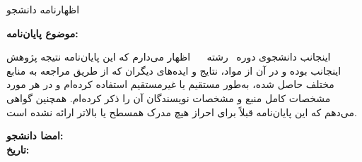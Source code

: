 
\begin{center}
  \vspace*{1.2cm}
  {\Titr\fontsize{18}{22}\selectfont اظهارنامه دانشجو}
\end{center}

\vspace{2em}

\noindent
\textbf{موضوع پایان‌نامه:} \TitleFA \par

\vspace{1em}

\noindent
اینجانب \textbf{\StudentNameFA} دانشجوی دوره \DegreeFA \ رشته \MajorFA \ \FacultyFA \ \UniversityFA
اظهار می‌دارم که این پایان‌نامه نتیجه پژوهش اینجانب بوده و در آن از مواد،
نتایج و ایده‌های دیگران که از طریق مراجعه به منابع مختلف حاصل شده، به‌طور
مستقیم یا غیرمستقیم استفاده کرده‌ام و در هر مورد مشخصات کامل منبع و مشخصات
نویسندگان آن را ذکر کرده‌ام. همچنین گواهی می‌دهم که این پایان‌نامه قبلاً برای
احراز هیچ مدرک همسطح یا بالاتر ارائه نشده است.

\vspace{2em}

\begin{flushleft}
  \bfseries
   امضا دانشجو: \hspace*{2cm}
  \\[1em]
  تاریخ: \hspace*{2cm}
\end{flushleft}

\clearpage
